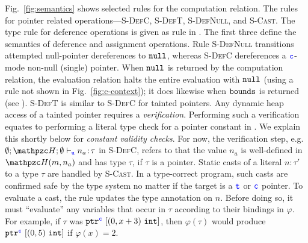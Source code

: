 {Fig.~\ref{fig:semantics} shows selected rules for the computation relation.
The rules for pointer related operations---\textsc{S-DefC},
\textsc{S-DefT}, \textsc{S-DefNull}, and \textsc{S-Cast}.
The type rule for deference operations is given as rule  in .
The first three define the semantics of deference and assignment operations.
Rule \textsc{S-DefNull} transitions attempted null-pointer
dereferences to $\mathtt{null}$, whereas \textsc{S-DefC} dereferences a $\textcolor{blue}{\texttt{c}}$-mode
non-null (single) pointer.
When $\mathtt{null}$ is returned by the
computation relation, the evaluation relation halts the entire
evaluation with $\mathtt{null}$ (using a rule not shown in Fig.~\ref{fig:c-context}); it
does likewise when $\mathtt{bounds}$ is returned (see ).
\textsc{S-DefT} is similar to \textsc{S-DefC} for tainted pointers.
Any dynamic heap access of a tainted pointer requires a \textit{verification}.
Performing such a verification equates to performing a literal type check for a pointer constant in .
We explain this shortly below for \emph{constant validity checks}.
For now, the verification step, e.g. $\emptyset;\heap ; \emptyset \vdash_{\umode}\evalue{n_a}{\tau}$ in \textsc{S-DefC},
refers to that the value $n_a$ is well-defined in $\heap(m,n_a)$ and has type $\tau$, if $\tau$ is a pointer.
Static casts of a literal $n\!:\!\tau'$ to a type $\tau$ are handled
by \textsc{S-Cast}. In a type-correct program, such casts are
confirmed safe by the type system no matter
if the target is a $\textcolor{blue}{\texttt{t}}$ or $\textcolor{blue}{\texttt{c}}$ pointer. To evaluate a cast, the rule
updates the type annotation on $n$. Before doing so, it must
``evaluate'' any variables that occur in $\tau$ according to their
bindings in $\varphi$. For example, if $\tau$ was
${\mathtt{ptr}^{\textcolor{blue}{\texttt{c}}}~{[{({0},{x+3})}~{\mathtt{int}}]}}$, then $\varphi(\tau)$ would
produce ${\mathtt{ptr}^{\textcolor{blue}{\texttt{c}}}~{[{({0},{5})}~{\mathtt{int}}]}}$ if $\varphi(x) = 2$.




}
